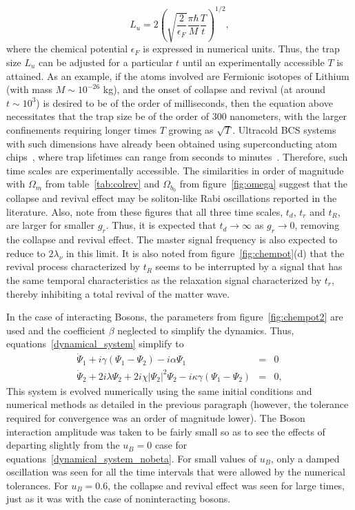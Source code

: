 \documentclass[a4paper,10pt]{article}
\begin{document}
\begin{equation}
 L_u=2\left(\sqrt{\frac{2}{\epsilon_F}}\frac{\pi \hbar }{M}\frac{T}{t}\right)^{1/2},
\end{equation}
where the chemical potential $\epsilon_F$ is expressed in numerical units. Thus, the trap size $L_u$ can be adjusted for a particular $t$ until an experimentally accessible $T$ is attained. As an example, if the atoms involved are Fermionic isotopes of Lithium (with mass $M\sim 10^{-26}$ kg), and the onset of collapse and revival (at around $t\sim 10^3$) is desired to be of the order of milliseconds, then the equation above necessitates that the trap size be of the order of $300$ nanometers, with the larger confinements requiring longer times $T$ growing as  $\sqrt{T}$. Ultracold BCS systems with such dimensions have already been obtained using superconducting atom chips~\cite{atom:chips}, where trap lifetimes can range from seconds to minutes~\cite{atomchips:traps}. Therefore, such time scales are experimentally accessible. The similarities in order of magnitude with $\Omega_m$ from table~\ref{tab:colrev} and $\Omega_{b_0}$ from figure~\ref{fig:omega} suggest that the collapse and revival effect may be soliton-like Rabi oscillations reported in the literature. Also, note from these figures that all three time scales, $t_d$, $t_r$ and $t_R$, are larger for smaller $g_r$. Thus, it is expected that $t_d \rightarrow \infty$ as $g_r \rightarrow 0$, removing the collapse and revival effect. The master signal frequency is also expected to reduce to $2\lambda_\nu$ in this limit. It is also noted from figure~\ref{fig:chempot}(d) that the revival process characterized by $t_R$ seems to be interrupted by a signal that has the same temporal characteristics as the relaxation signal characterized by $t_r$, thereby inhibiting a total revival of the matter wave. 

In the case of interacting Bosons, the parameters from figure~\ref{fig:chempot2} are used and  the coefficient $\beta$ neglected to simplify the dynamics. Thus, equations~\ref{dynamical_system} simplify to
\begin{eqnarray}
\label{dynamical_system_nobeta_int}
\dot \Psi_1 + i\gamma \left( \Psi_1-\Psi_2 \right) - i\alpha \Psi_1  &=& 0 \nonumber \\
\dot \Psi_2 +2 i \lambda \Psi_2 +2 i\chi|\Psi_2|^2\Psi_2 - i\kappa\gamma \left(\Psi_1-\Psi_2 \right) &=& 0,
\end{eqnarray}
This system is evolved numerically using the same initial conditions and numerical methods as detailed in the previous paragraph (however, the tolerance required for convergence was an order of magnitude lower). The Boson interaction amplitude was taken to be fairly small so as to see the effects of departing slightly from the $u_B=0$ case for equations~\ref{dynamical_system_nobeta}. For small values of $u_B$, only a damped oscillation was seen for all the time intervals that were allowed by the numerical tolerances. For $u_B = 0.6$, the collapse and revival effect was seen for large times, just as it was with the case of noninteracting bosons. 
\end{document}
